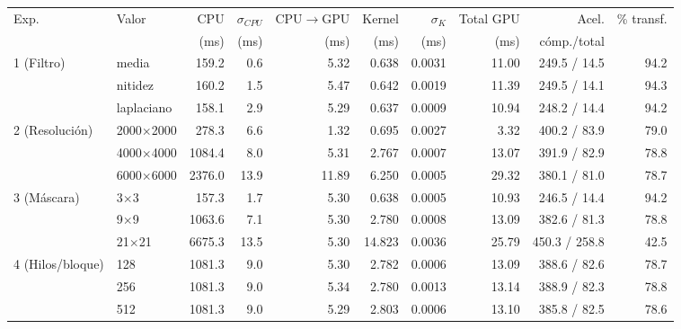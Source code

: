 \begin{tabular}{llrrrrrrrr}
\toprule
Exp. & Valor & CPU & $\sigma_{CPU}$ & CPU$\to$GPU & Kernel & $\sigma_{K}$ & Total GPU & Acel. & \% transf. \\
 & & (ms) & (ms) & (ms) & (ms) & (ms) & (ms) & cómp./total & \\
\midrule
1 (Filtro) & media & 159.2 & 0.6 & 5.32 & 0.638 & 0.0031 & 11.00 & 249.5 / 14.5 & 94.2 \\
 & nitidez & 160.2 & 1.5 & 5.47 & 0.642 & 0.0019 & 11.39 & 249.5 / 14.1 & 94.3 \\
 & laplaciano & 158.1 & 2.9 & 5.29 & 0.637 & 0.0009 & 10.94 & 248.2 / 14.4 & 94.2 \\
\midrule
2 (Resolución) & 2000$\times$2000 & 278.3 & 6.6 & 1.32 & 0.695 & 0.0027 & 3.32 & 400.2 / 83.9 & 79.0 \\
 & 4000$\times$4000 & 1084.4 & 8.0 & 5.31 & 2.767 & 0.0007 & 13.07 & 391.9 / 82.9 & 78.8 \\
 & 6000$\times$6000 & 2376.0 & 13.9 & 11.89 & 6.250 & 0.0005 & 29.32 & 380.1 / 81.0 & 78.7 \\
\midrule
3 (Máscara) & 3$\times$3 & 157.3 & 1.7 & 5.30 & 0.638 & 0.0005 & 10.93 & 246.5 / 14.4 & 94.2 \\
 & 9$\times$9 & 1063.6 & 7.1 & 5.30 & 2.780 & 0.0008 & 13.09 & 382.6 / 81.3 & 78.8 \\
 & 21$\times$21 & 6675.3 & 13.5 & 5.30 & 14.823 & 0.0036 & 25.79 & 450.3 / 258.8 & 42.5 \\
\midrule
4 (Hilos/bloque) & 128 & 1081.3 & 9.0 & 5.30 & 2.782 & 0.0006 & 13.09 & 388.6 / 82.6 & 78.7 \\
 & 256 & 1081.3 & 9.0 & 5.34 & 2.780 & 0.0013 & 13.14 & 388.9 / 82.3 & 78.8 \\
 & 512 & 1081.3 & 9.0 & 5.29 & 2.803 & 0.0006 & 13.10 & 385.8 / 82.5 & 78.6 \\
\bottomrule
\end{tabular}
